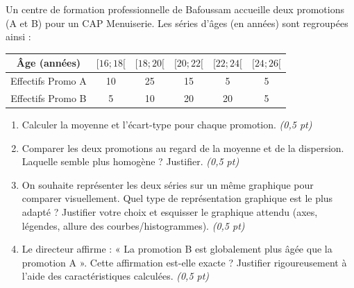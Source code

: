 \documentclass[11pt]{article}
\begin{document}
\begin{exercice}
Un centre de formation professionnelle de Bafoussam accueille deux promotions (A et B) pour un CAP Menuiserie. Les séries d'âges (en années) sont regroupées ainsi :
\begin{center}
\begin{tabular}{|c|c|c|c|c|c|}
\hline
Âge (années) & $[16; 18[$ & $[18; 20[$ & $[20; 22[$ & $[22; 24[$ & $[24; 26[$ \\ \hline
Effectifs Promo A & 10 & 25 & 15 & 5 & 5 \\ \hline
Effectifs Promo B & 5 & 10 & 20 & 20 & 5 \\ \hline
\end{tabular}
\end{center}
\begin{enumerate}
    \item Calculer la moyenne et l'écart-type pour chaque promotion. \textit{(0,5 pt)}
    \item Comparer les deux promotions au regard de la moyenne et de la dispersion. Laquelle semble plus homogène ? Justifier. \textit{(0,5 pt)}
    \item On souhaite représenter les deux séries sur un même graphique pour comparer visuellement. Quel type de représentation graphique est le plus adapté ? Justifier votre choix et esquisser le graphique attendu (axes, légendes, allure des courbes/histogrammes). \textit{(0,5 pt)}
    \item Le directeur affirme : « La promotion B est globalement plus âgée que la promotion A ». Cette affirmation est-elle exacte ? Justifier rigoureusement à l'aide des caractéristiques calculées. \textit{(0,5 pt)}
\end{enumerate}
\end{exercice}
\end{document}
